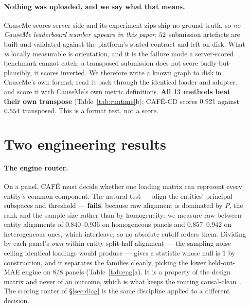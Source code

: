 \documentclass[10pt,twocolumn]{article}
\newcommand{\cafe}{CAF\'E}
\DeclareRobustCommand{\cd}{\cafe{}\nobreakdash-CD}
\begin{document}
\paragraph{Nothing was uploaded, and we say what that means.} CauseMe scores
server-side and its experiment zips ship no ground truth, so \emph{no CauseMe
leaderboard number appears in this paper}; $52$ submission artefacts are built
and validated against the platform's stated contract and left on disk. What \emph{is}
locally measurable is orientation, and it is the failure mode a server-scored benchmark
cannot catch: a transposed submission does not score badly-but-plausibly, it scores
inverted. We therefore write a known graph to disk in CauseMe's own format, read it back
through the identical loader and adapter, and score it with CauseMe's own metric
definitions. \textbf{All $13$ methods beat their own transpose}
(Table~\ref{tab:runtime}b); \cd{} scores $0.921$ against $0.554$ transposed. This is a format test, not a score.



\section{Two engineering results}\label{sec:eng}
\paragraph{The engine router.} On a panel, \cafe{} must decide whether one loading
matrix can represent every entity's common component. The natural test --- align the
entities' principal subspaces and threshold --- \textbf{fails}, because raw alignment is
dominated by $P$, the rank and the sample size rather than by homogeneity: we measure
raw between-entity alignments of $0.840$--$0.936$ on homogeneous panels and
$0.857$--$0.942$ on heterogeneous ones, which interleave, so no absolute cutoff orders
them. Dividing by each panel's \emph{own} within-entity split-half alignment --- the
sampling-noise ceiling identical loadings would produce --- gives a statistic whose null
is $1$ by construction, and it separates the families cleanly, picking the lower
held-out-MAE engine on $8/8$ panels (Table~\ref{tab:eng}a). It is a property of the
design matrix and never of an outcome, which is what keeps the routing
causal-clean~\cite{position}. The scoring router of \S\ref{sec:diag} is the same
discipline applied to a different decision.
\end{document}
